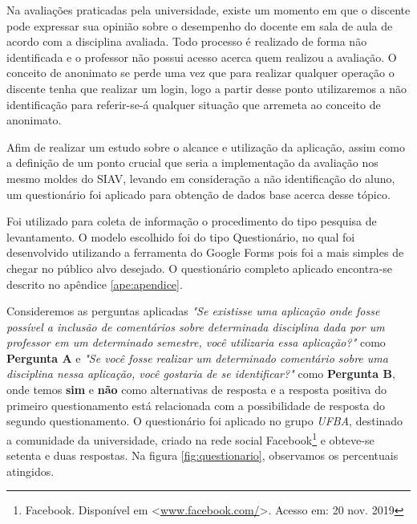 \documentclass[12pt, a4paper]{report}
\begin{document}
Na avaliações praticadas pela universidade, existe um momento em que o discente pode expressar sua opinião sobre o desempenho do docente em sala de aula de acordo com a disciplina avaliada. Todo processo é realizado de forma não identificada e o professor não possui acesso acerca quem realizou a avaliação. O conceito de anonimato se perde uma vez que para realizar qualquer operação o discente tenha que realizar um login, logo a partir desse ponto utilizaremos a não identificação para referir-se-á qualquer situação que arremeta ao conceito de anonimato.

Afim de realizar um estudo sobre o alcance e utilização da aplicação, assim como a definição de um ponto crucial que seria a implementação da avaliação nos mesmo moldes do SIAV, levando em consideração a não identificação do aluno, um questionário foi aplicado para obtenção de dados base acerca desse tópico. %

Foi utilizado para coleta de informação o procedimento do tipo pesquisa de levantamento. O modelo escolhido foi do tipo Questionário, no qual foi desenvolvido utilizando a ferramenta do Google Forms pois foi a mais simples de chegar no público alvo desejado. O questionário completo aplicado encontra-se descrito no apêndice \ref{ape:apendice}.

Consideremos as perguntas aplicadas \textit{"Se existisse uma aplicação onde fosse possível a inclusão de comentários sobre determinada disciplina dada por um professor em um determinado semestre, você utilizaria essa aplicação?"} como \textbf{Pergunta A} e \textit{ 
"Se você fosse realizar um determinado comentário sobre uma disciplina nessa aplicação, você gostaria de se identificar?"} como \textbf{Pergunta B}, onde temos \textbf{sim} e \textbf{não} como alternativas de resposta e a resposta positiva do primeiro questionamento está relacionada com a possibilidade de resposta do segundo questionamento. O questionário foi aplicado no grupo \textit{UFBA}, destinado a comunidade da universidade, criado na rede social Facebook\footnote{Facebook. Disponível em <\url{www.facebook.com/}>. Acesso em: 20 nov. 2019} e obteve-se setenta e duas respostas. Na figura \ref{fig:questionario}, observamos os percentuais atingidos.
\end{document}
